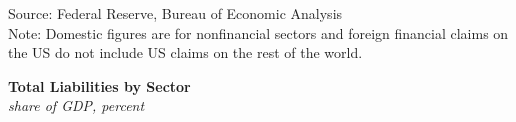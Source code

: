 \documentclass{report}
\newcommand{\tbllink}[1]{\href{https://raw.githubusercontent.com/bdecon/US-chartbook/master/chartbook/data/#1}{\faTable}}
\begin{document}
{\begin{minipage}{0.76\textwidth}
{ \setlength{\tabcolsep}{3.0pt} \color{black!90}
{\renewcommand{\arraystretch}{1.55}
\hspace*{-1mm} \begin{tabular}{p{37.6mm} R{11.4mm} R{11.2mm} R{11.2mm} R{11.2mm} R{10.7mm} R{10.2mm}}
		 \hline
	\end{tabular}}}
\vspace{-1mm}

\footnotesize{Source: Federal Reserve, Bureau of Economic Analysis}  \hfill \tbllink{liabsh.csv} \ \tbllink{liabpc.csv}\\
\footnotesize{Note: Domestic figures are for nonfinancial sectors and foreign financial claims on the US do not include US claims on the rest of the world.}
\end{minipage}
\newpage
{}
\begin{minipage}{0.76\textwidth}
\small 
\end{minipage}

\begin{minipage}{0.35\textwidth} 
\normalsize \textbf{Total Liabilities by Sector}\\
\footnotesize{\textit{share of GDP, percent}}
\vspace{4.6cm}


\end{minipage}}
\end{document}
